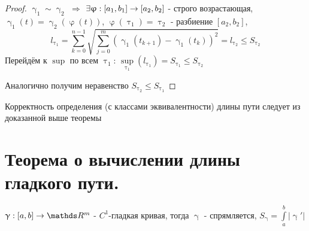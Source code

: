 \documentclass[12pt, fleqn]{article}
\begin{document}
\begin{Property}[3]
\begin{Property}[4]
\begin{Property}[2, аддитивность]
\begin{Proof}
\begin{proof}
    $\upgamma_1 \sim \upgamma_2$ $\Rightarrow$ $\exists \upvarphi: [a_1, b_1] \rightarrow [a_2, b_2]$ - строго возрастающая, $\upgamma_1(t) = \upgamma_2(\upvarphi(t))$, $\upvarphi(\uptau_1) = \uptau_2$ - разбиение $[a_2,b_2]$, 
    $$l_{\uptau_1} = \sum\limits_{k=0}^{n-1} \sqrt{\sum\limits_{j=0}^m (\upgamma_1(t_{k+1}) - \upgamma_1(t_k))^2} = l_{\uptau_2} \leqslant S_{\uptau_2}$$
    Перейдём к $\sup$ по всем $\uptau_1$: $\sup\limits_{\uptau_1} (l_{\uptau_1}) = S_{\uptau_1} \leqslant S_{\uptau_2}$
    
    Аналогично получим неравенство $S_{\uptau_2} \leqslant S_{\uptau_1}$ 
\end{proof}

\begin{remark}
    Корректность определения (с классами эквивалентности) длины пути следует из доказанной выше теоремы
\end{remark}

\newpage
\section{Теорема о вычислении длины гладкого пути.}
 
\begin{theorem}
    $\upgamma: [a,b] \rightarrow \R^m$ - $C^1$-гладкая кривая, тогда $\upgamma$ - спрямляется, $S_{\upgamma} = \int\limits_a^b |\upgamma'|$
\end{theorem}


\end{Proof}
\end{Property}
\end{Property}
\end{Property}
\end{document}
